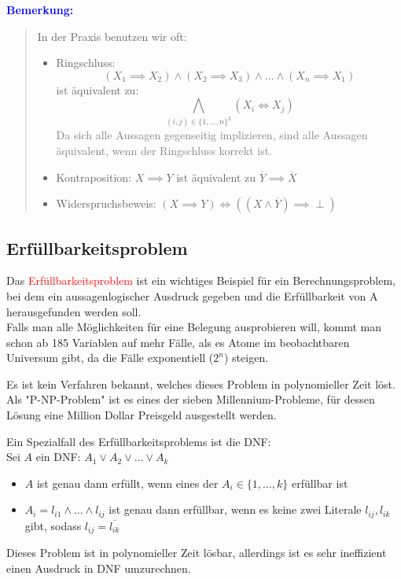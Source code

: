 \documentclass{article}
\newcommand{\red}[1]{\textcolor{red}{#1}}
\newcommand{\gray}[1]{\textcolor{gray}{#1}}
\newcommand{\blue}[1]{\textcolor{blue}{#1}}
\newcommand{\an}[1]{\blue{\textbf{Bemerkung: }}\begin{quote}#1\end{quote}}
\newcommand{\n}[1]{\overline{#1}}
\begin{document}
\an{
    In der Praxis benutzen wir oft:
    \begin{itemize}
        \item Ringschluss:
        \[
            (X_1 \implies X_2) \land (X_2 \implies X_3) \land \dots \land (X_n \implies X_1)
        \]
        ist äquivalent zu:
        \[
            \bigwedge_{(i,j) \in \{1, \dots, n\}^2} (X_i \iff X_j)
        \]
        \gray{Da sich alle Aussagen gegenseitig implizieren, sind alle Aussagen äquivalent, wenn der Ringschluss korrekt ist.}
        \item Kontraposition: \(X \implies Y\) ist äquivalent zu \(\n{Y} \implies \n{X}\)
        \item Widerspruchsbeweis: \((X \implies Y) \iff ((X \land \n{Y}) \implies \perp)\)
    \end{itemize}
}

\subsection{Erfüllbarkeitsproblem}

Das \red{Erfüllbarkeitsproblem} ist ein wichtiges Beispiel für ein Berechnungsproblem, bei dem ein aussagenlogischer Ausdruck gegeben und die Erfüllbarkeit von A herausgefunden werden soll.\\
Falls man alle Möglichkeiten für eine Belegung ausprobieren will, kommt man schon ab 185 Variablen auf mehr Fälle, als es Atome im beobachtbaren Universum gibt, da die Fälle exponentiell ($2^n$) steigen.

Es ist kein Verfahren bekannt, welches dieses Problem in polynomieller Zeit löst.\\
Als "P-NP-Problem" ist es eines der sieben Millennium-Probleme, für dessen Lösung eine Million Dollar Preisgeld ausgestellt werden.


Ein Spezialfall des Erfüllbarkeitsproblems ist die DNF:\\
Sei $A$ ein DNF: \(A_1 \lor A_2 \lor \dots \lor A_k\)
\begin{itemize}
    \item $A$ ist genau dann erfüllt, wenn eines der \(A_i \in \{1, \dots, k\}\) erfüllbar ist
    \item $A_i = l_{i1} \land \dots \land l_{ij}$ ist genau dann erfüllbar, wenn es keine zwei Literale \(l_{ij}, l_{ik}\) gibt, sodass \(l_{ij} = \n{l_{ik}}\)
\end{itemize}
Dieses Problem ist in polynomieller Zeit lösbar, allerdings ist es sehr ineffizient einen Ausdruck in DNF umzurechnen.
\end{document}
